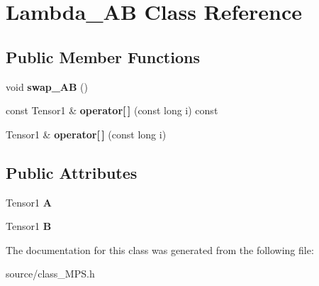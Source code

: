\hypertarget{class_lambda___a_b}{}\section{Lambda\+\_\+\+AB Class Reference}
\label{class_lambda___a_b}
\subsection*{Public Member Functions}
\begin{DoxyCompactItemize}
\item 
void {\bfseries swap\+\_\+\+AB} ()\hypertarget{class_lambda___a_b_a6a57ced95bf268118d2fc0c83691bac7}{}\label{class_lambda___a_b_a6a57ced95bf268118d2fc0c83691bac7}

\item 
const Tensor1 \& {\bfseries operator\mbox{[}$\,$\mbox{]}} (const long i) const \hypertarget{class_lambda___a_b_a00fbf05097301861337a83d302c71b2e}{}\label{class_lambda___a_b_a00fbf05097301861337a83d302c71b2e}

\item 
Tensor1 \& {\bfseries operator\mbox{[}$\,$\mbox{]}} (const long i)\hypertarget{class_lambda___a_b_ae4a083b5bd213660393ee23f026a754e}{}\label{class_lambda___a_b_ae4a083b5bd213660393ee23f026a754e}

\end{DoxyCompactItemize}
\subsection*{Public Attributes}
\begin{DoxyCompactItemize}
\item 
Tensor1 {\bfseries A}\hypertarget{class_lambda___a_b_a5939f54163eb2bc57387a68753ee10cd}{}\label{class_lambda___a_b_a5939f54163eb2bc57387a68753ee10cd}

\item 
Tensor1 {\bfseries B}\hypertarget{class_lambda___a_b_ac18ede41ad7d8f32ae02b7530061f783}{}\label{class_lambda___a_b_ac18ede41ad7d8f32ae02b7530061f783}

\end{DoxyCompactItemize}


The documentation for this class was generated from the following file\+:\begin{DoxyCompactItemize}
\item 
source/class\+\_\+\+M\+P\+S.\+h\end{DoxyCompactItemize}

